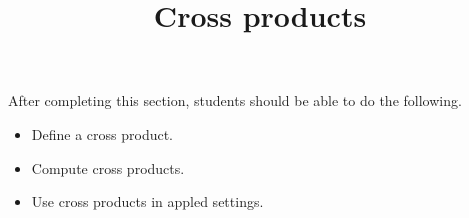 \documentclass{ximera}
\title{Cross products}
\begin{document}
\begin{abstract}
\end{abstract}

\maketitle

\begin{sectionOutcomes}

After completing this section, students should be able to do the following.

\begin{itemize}
\item Define a cross product.
\item Compute cross products.
\item Use cross products in appled settings. 
\end{itemize}

\end{sectionOutcomes}
\end{document}
